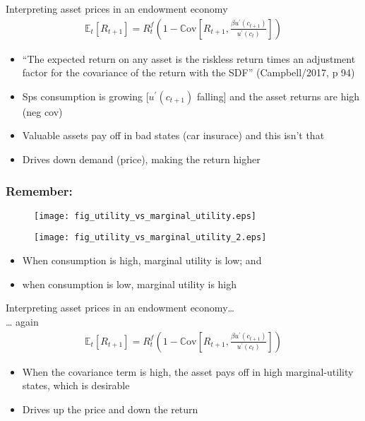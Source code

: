 \documentclass[presentation]{beamer}
\begin{document}
\begin{frame}[label=sec-4-5]{Interpreting asset prices in an endowment economy}
\begin{align*}
\mathbb{E}_{t} \left[ R_{t+1} \right] = R^{f}_{t} \left( 1 - \mathbb{C} \text{ov} \left[ R_{t+1}, \frac{\beta u^{\prime}(c_{t+1})}{u^{\prime}(c_{t})} \right] \right)
\end{align*}

\begin{itemize}
\item ``The expected return on any asset is the riskless return times an adjustment factor for the covariance of the return with the SDF'' (Campbell/2017, p 94)
\item Sps consumption is growing [$u^{\prime}(c_{t+1})$ falling] and the asset returns are high (neg cov)
\item Valuable assets pay off in bad states (car insurace) and this isn't that
\item Drives down demand (price), making the return higher
\end{itemize}
\end{frame}

\begin{frame}
\frametitle{Remember:}
\begin{figure}
\centering
\begin{minipage}{.5\textwidth}
  \centering
  \texttt{[image: fig\_utility\_vs\_marginal\_utility.eps]}
\end{minipage}%
\begin{minipage}{.5\textwidth}
  \centering
  \texttt{[image: fig\_utility\_vs\_marginal\_utility\_2.eps]}
\end{minipage}
\end{figure}
\begin{itemize}
\item When consumption is high, marginal utility is low; and
\item when consumption is low, marginal utility is high
\end{itemize}
\end{frame}

\begin{frame}[label=sec-4-6]{Interpreting asset prices in an endowment economy\dots{} \\ \dots{} again}
\begin{align*}
\mathbb{E}_{t} \left[ R_{t+1} \right] = R^{f}_{t} \left( 1 - \mathbb{C} \text{ov} \left[ R_{t+1}, \frac{\beta u^{\prime}(c_{t+1})}{u^{\prime}(c_{t})} \right] \right)
\end{align*}

\begin{itemize}
\item When the covariance term is high, the asset pays off in high marginal-utility states, which is desirable
\item Drives up the price and down the return
\end{itemize}
\end{frame}
\end{document}
